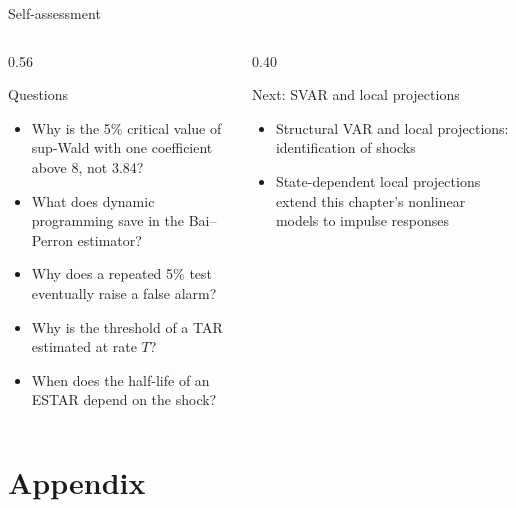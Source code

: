 \begin{frame}{Self-assessment}
\itemsize{\small}
\begin{columns}[T]
\begin{column}{0.56\textwidth}
\begin{block}{Questions}
\begin{itemize}
    \item Why is the 5\% critical value of sup-Wald with one coefficient above 8, not 3.84?
    \item What does dynamic programming save in the Bai--Perron estimator?
    \item Why does a repeated 5\% test eventually raise a false alarm?
    \item Why is the threshold of a TAR estimated at rate $T$?
    \item When does the half-life of an ESTAR depend on the shock?
\end{itemize}
\end{block}
\end{column}
\begin{column}{0.40\textwidth}
\begin{block}{Next: SVAR and local projections}
\begin{itemize}
    \item Structural VAR and local projections: identification of shocks
    \item State-dependent local projections extend this chapter's nonlinear models to impulse responses
\end{itemize}
\end{block}
\end{column}
\end{columns}
\end{frame}


\section{Appendix}

